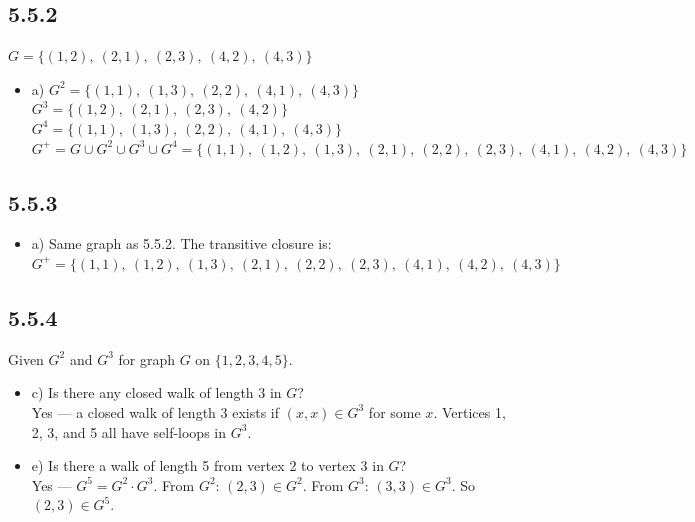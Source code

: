 \documentclass{article}
\begin{document}
\subsection*{5.5.2}
$G = \{(1,2),\ (2,1),\ (2,3),\ (4,2),\ (4,3)\}$
\begin{itemize}
    \item a) $G^2 = \{(1,1),\ (1,3),\ (2,2),\ (4,1),\ (4,3)\}$\\
    $G^3 = \{(1,2),\ (2,1),\ (2,3),\ (4,2)\}$\\
    $G^4 = \{(1,1),\ (1,3),\ (2,2),\ (4,1),\ (4,3)\}$\\
    $G^+ = G \cup G^2 \cup G^3 \cup G^4 = \{(1,1),\ (1,2),\ (1,3),\ (2,1),\ (2,2),\ (2,3),\ (4,1),\ (4,2),\ (4,3)\}$
\end{itemize}

\subsection*{5.5.3}
\begin{itemize}
    \item a) Same graph as 5.5.2. The transitive closure is:\\
    $G^+ = \{(1,1),\ (1,2),\ (1,3),\ (2,1),\ (2,2),\ (2,3),\ (4,1),\ (4,2),\ (4,3)\}$
\end{itemize}

\subsection*{5.5.4}
Given $G^2$ and $G^3$ for graph $G$ on $\{1,2,3,4,5\}$.
\begin{itemize}
    \item c) Is there any closed walk of length 3 in $G$?\\
    Yes --- a closed walk of length 3 exists if $(x,x) \in G^3$ for some $x$. Vertices 1, 2, 3, and 5 all have self-loops in $G^3$.

    \item e) Is there a walk of length 5 from vertex 2 to vertex 3 in $G$?\\
    Yes --- $G^5 = G^2 \cdot G^3$. From $G^2$: $(2,3) \in G^2$. From $G^3$: $(3,3) \in G^3$. So $(2,3) \in G^5$.
\end{itemize}
\end{document}
